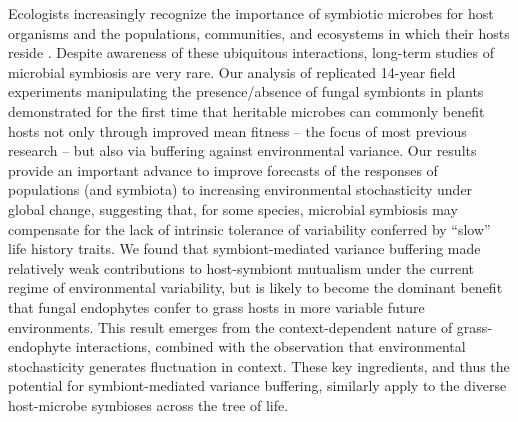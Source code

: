 \documentclass[9pt,twocolumn,twoside]{pnas-new}
\begin{document}
Ecologists increasingly recognize the importance of symbiotic microbes for host organisms and the populations, communities, and ecosystems in which their hosts reside \cite{afkhami2016native,smith2017symbiont,dallas2022captivity,wu2022reduction}.
Despite awareness of these ubiquitous interactions, long-term studies of microbial symbiosis are very rare. 
Our analysis of replicated 14-year field experiments manipulating the presence/absence of fungal symbionts in plants demonstrated for the first time that heritable microbes can commonly benefit hosts not only through improved mean fitness -- the focus of most previous research -- but also via buffering against environmental variance. 
Our results provide an important advance to improve forecasts of the responses of populations (and symbiota) to increasing environmental stochasticity under global change, suggesting that, for some species, microbial symbiosis may compensate for the lack of intrinsic tolerance of variability conferred by ``slow'' life history traits. 
We found that symbiont-mediated variance buffering made relatively weak contributions to host-symbiont mutualism under the current regime of environmental variability, but is likely to become the dominant benefit that fungal endophytes confer to grass hosts in more variable future environments.
This result emerges from the context-dependent nature of grass-endophyte interactions, combined with the observation that environmental stochasticity generates fluctuation in context. 
These key ingredients, and thus the potential for symbiont-mediated variance buffering, similarly apply to the diverse host-microbe symbioses across the tree of life. 
\end{document}
